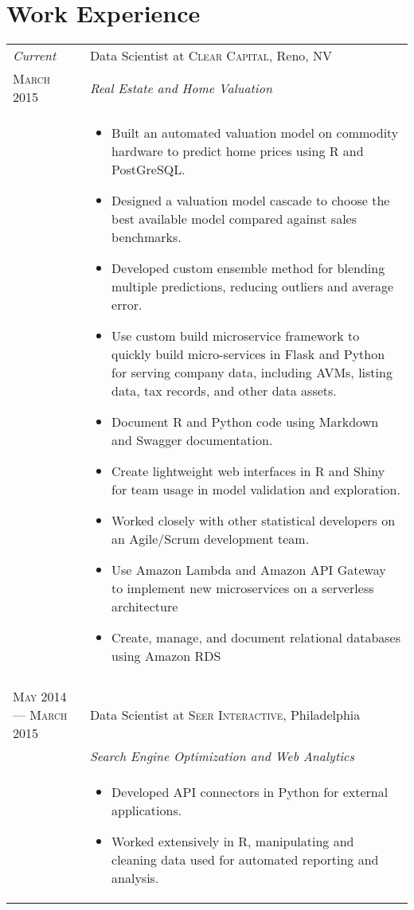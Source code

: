 \documentclass[a4paper,10pt]{article}
\begin{document}
\section{Work Experience}
\begin{longtable}{p{} | p{} |}
  \emph{Current} & Data Scientist at \textsc{Clear Capital}, Reno, NV \\
  \textsc{March 2015}&\emph{Real Estate and Home Valuation}\\
    &\footnotesize{ 
    \begin{itemize}
      \item Built an automated valuation model on commodity hardware to predict home prices using R and PostGreSQL.
      \item Designed a valuation model cascade to choose the best available model compared against sales benchmarks. 
      \item Developed custom ensemble method for blending multiple predictions, reducing outliers and average error.
      \item Use custom build microservice framework to quickly build micro-services in Flask and Python for serving company data, including AVMs, listing data, tax records, and other data assets. 
      \item Document R and Python code using Markdown and Swagger documentation.
      \item Create lightweight web interfaces in R and Shiny for team usage in model validation and exploration.
      \item Worked closely with other statistical developers on an Agile/Scrum development team.
      \item Use Amazon Lambda and Amazon API Gateway to implement new microservices on a serverless architecture
      \item Create, manage, and document relational databases using Amazon RDS
  \end{itemize}
    }\\
  \multicolumn{2}{c}{} \\
  \textsc{May 2014 --- March 2015} & Data Scientist at \textsc{Seer Interactive}, Philadelphia \\ 
    &\emph{Search Engine Optimization and Web Analytics}\\ 
      &\footnotesize{ 
      \begin{itemize}
        \item Developed API connectors in Python for external applications. 
        \item Worked extensively in R, manipulating and cleaning data used for automated reporting and analysis.

\end{itemize}}
\end{longtable}
\end{document}
